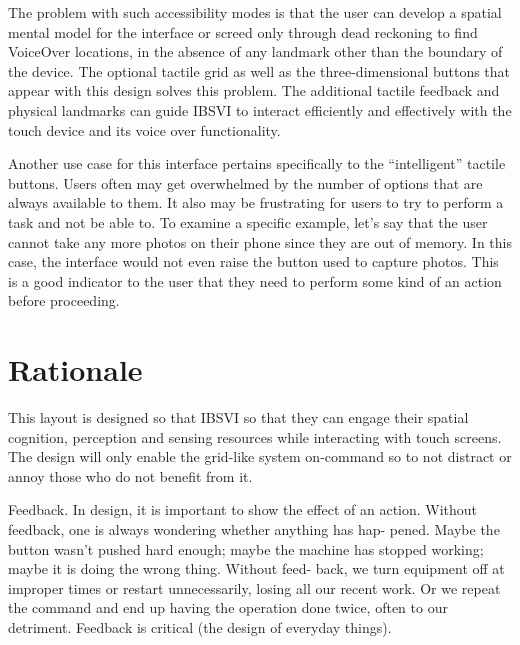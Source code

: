 \documentclass[11pt]{article}
\begin{document}
The problem with such accessibility modes is that the user can develop a spatial mental model for the interface or screed only through dead reckoning to find VoiceOver locations, in the absence of any landmark other than the boundary of the device. The optional tactile grid as well as the three-dimensional buttons that appear with this design solves this problem. The additional tactile feedback and physical landmarks can guide IBSVI to interact efficiently and effectively with the touch device and its voice over functionality.

Another use case for this interface pertains specifically to the ``intelligent'' tactile buttons. Users often may get overwhelmed by the number of options that are always available to them. It also may be frustrating for users to try to perform a task and not be able to. To examine a specific example, let's say that the user cannot take any more photos on their phone since they are out of memory. In this case, the interface would not even raise the button used to capture photos. This is a good indicator to the user that they need to perform some kind of an action before proceeding.

\section{Rationale}
This layout is designed so that IBSVI so that they can engage their spatial cognition, perception and sensing resources while interacting with touch screens. The design will only enable the grid-like system on-command so to not distract or annoy those who do not benefit from it.

Feedback. In design, it is important to show the effect of an action. Without feedback, one is always wondering whether anything has hap- pened. Maybe the button wasn't pushed hard enough; maybe the machine has stopped working; maybe it is doing the wrong thing. Without feed- back, we turn equipment off at improper times or restart unnecessarily, losing all our recent work. Or we repeat the command and end up having the operation done twice, often to our detriment. Feedback is critical (the design of everyday things).
\end{document}
